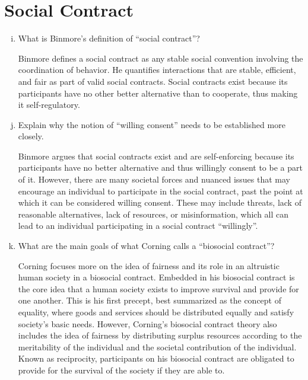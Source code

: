 \documentclass{article}
\begin{document}
\section*{Social Contract}
\begin{enumerate}[a)]
  \setcounter{enumi}{8}
  \item What is Binmore's definition of ``social contract''?
  \par Binmore defines a social contract as any stable social convention involving the coordination of behavior. He quantifies interactions that are stable, efficient, and fair as part of valid social contracts. Social contracts exist because its participants have no other better alternative than to cooperate, thus making it self-regulatory.
  \item Explain why the notion of ``willing consent'' needs to be established more closely.
  \par Binmore argues that social contracts exist and are self-enforcing because its participants have no better alternative and thus willingly consent to be a part of it. However, there are many societal forces and nuanced issues that may encourage an individual to participate in the social contract, past the point at which it can be considered willing consent. These may include threats, lack of reasonable alternatives, lack of resources, or misinformation, which all can lead to an individual participating in a social contract ``willingly''.
  \item What are the main goals of what Corning calls a ``biosocial contract''?
  \par Corning focuses more on the idea of fairness and its role in an altruistic human society in a biosocial contract. Embedded in his biosocial contract is the core idea that a human society exists to improve survival and provide for one another. This is his first precept, best summarized as the concept of equality, where goods and services should be distributed equally and satisfy society's basic needs. However, Corning's biosocial contract theory also includes the idea of fairness by distributing surplus resources according to the meritability of the individual and the societal contribution of the individual. Known as reciprocity, participants on his biosocial contract are obligated to provide for the survival of the society if they are able to.
\end{enumerate}
\end{document}
